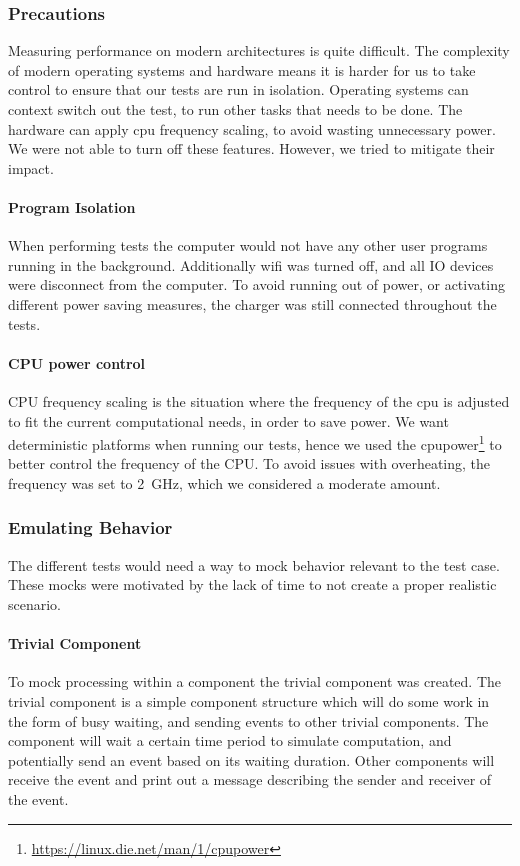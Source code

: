 \subsubsection{Precautions}
Measuring performance on modern architectures is quite difficult. The complexity of modern operating systems and hardware means
it is harder for us to take control to ensure that our tests are run in isolation.
Operating systems can context switch out the test, to run other tasks that needs to be done.
The hardware can apply cpu frequency scaling, to avoid wasting unnecessary power.
We were not able to turn off these features. However, we tried to mitigate their impact.

\paragraph{Program Isolation}
When performing tests the computer would not have any other user programs running in the background.
Additionally wifi was turned off, and all IO devices were disconnect from the computer.
To avoid running out of power, or activating different power saving measures, the charger was still connected
throughout the tests.

\paragraph{CPU power control}
CPU frequency scaling is the situation where the frequency of the cpu is adjusted to fit the current computational needs,
in order to save power\cite{cpu_scaling}.
We want deterministic platforms when running our tests, hence we used the cpupower\footnote{\url{https://linux.die.net/man/1/cpupower}}
to better control the frequency of the CPU. To avoid issues with overheating, the frequency was set to \SI{2}{\giga\hertz},
which we considered a moderate amount.

\subsubsection{Emulating Behavior}
The different tests would need a way to mock behavior relevant to the test case.
These mocks were motivated by the lack of time to not create a proper realistic scenario.

\paragraph{Trivial Component}
\label{par:test_cases_trivial_component}
To mock processing within a component the trivial component was created.
The trivial component is a simple component structure which will do some work in the form of busy waiting,
and sending events to other trivial components.
The component will wait a certain time period to simulate computation, and potentially send an event
based on its waiting duration.
Other components will receive the event and print out a message describing the sender and receiver of the event.

